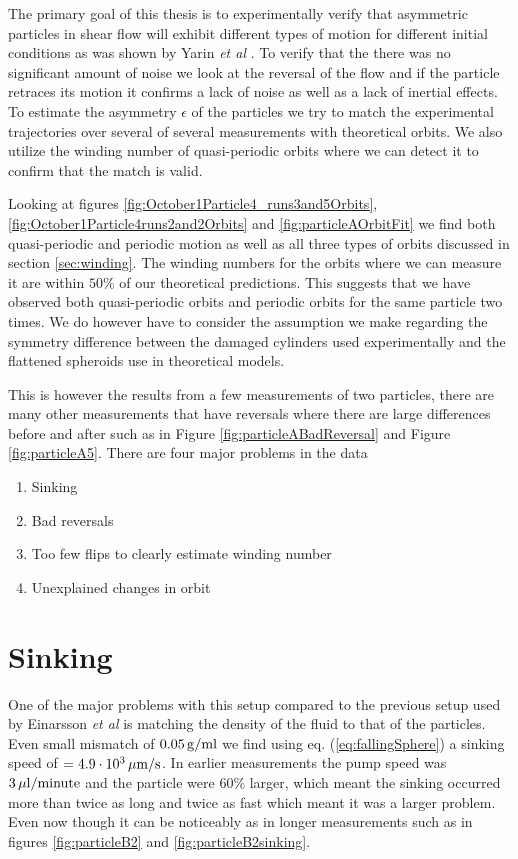 The primary goal of this thesis is to experimentally verify that asymmetric particles in shear flow will exhibit different types of motion for different initial conditions as was shown by Yarin \emph{et al} \cite{Yarin}. To verify that the there was no significant amount of noise we look at the reversal of the flow and if the particle retraces its motion it confirms a lack of noise as well as a lack of inertial effects. To estimate the asymmetry $\epsilon$ of the particles we try to match the experimental trajectories over several of several measurements with theoretical orbits. We also utilize the winding number of quasi-periodic orbits where we can detect it to confirm that the match is valid.

Looking at figures \ref{fig:October1Particle4_runs3and5Orbits}, \ref{fig:October1Particle4runs2and2Orbits} and \ref{fig:particleAOrbitFit} we find both quasi-periodic and periodic motion as well as all three types of orbits discussed in section \ref{sec:winding}. The winding numbers for the orbits where we can measure it are within $50\%$ of our theoretical predictions. This suggests that we have observed both quasi-periodic orbits and periodic orbits for the same particle two times. We do however have to consider the assumption we make regarding the symmetry difference between the damaged cylinders used experimentally and the flattened spheroids use in theoretical models.

This is however the results from a few measurements of two particles, there are many other measurements that have reversals where there are large differences before and after such as in Figure \ref{fig:particleABadReversal} and Figure \ref{fig:particleA5}. There are four major problems in the data 

\begin{enumerate}
\item Sinking
\item Bad reversals
\item Too few flips to clearly estimate winding number
\item Unexplained changes in orbit
\end{enumerate}

\section{Sinking}
One of the major problems with this setup compared to the previous setup used by Einarsson \emph{et al} \cite{JonasExperiment} is matching the density of the fluid to that of the particles. Even small mismatch of $\unit[0.05]{g/ml}$ we find using eq. (\ref{eq:fallingSphere}) a sinking speed of $= \unit[4.9\cdot10^3 ]{\mu m/s}$. In earlier measurements the pump speed was $\unit[3]{\mu l/minute}$ and the particle were 60\% larger, which meant the sinking occurred more than twice as long and twice as fast which meant it was a larger problem. Even now though it can be noticeably as in longer measurements such as in figures \ref{fig:particleB2} and \ref{fig:particleB2sinking}.

